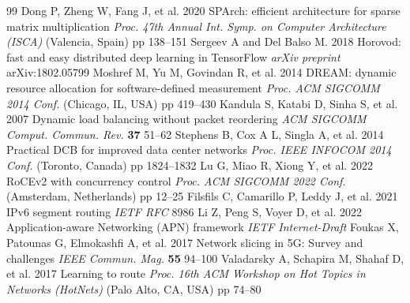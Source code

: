 \documentclass[a4paper]{jpconf}
\begin{document}
\begin{thebibliography}{99}
 Dong P, Zheng W, Fang J, et al. 2020 SPArch: efficient architecture for sparse matrix multiplication \textit{Proc. 47th Annual Int. Symp. on Computer Architecture (ISCA)} (Valencia, Spain) pp 138--151
 Sergeev A and Del Balso M. 2018 Horovod: fast and easy distributed deep learning in TensorFlow \textit{arXiv preprint} arXiv:1802.05799
 Moshref M, Yu M, Govindan R, et al. 2014 DREAM: dynamic resource allocation for software-defined measurement \textit{Proc. ACM SIGCOMM 2014 Conf.} (Chicago, IL, USA) pp 419--430
 Kandula S, Katabi D, Sinha S, et al. 2007 Dynamic load balancing without packet reordering \textit{ACM SIGCOMM Comput. Commun. Rev.} \textbf{37} 51--62
 Stephens B, Cox A L, Singla A, et al. 2014 Practical DCB for improved data center networks \textit{Proc. IEEE INFOCOM 2014 Conf.} (Toronto, Canada) pp 1824--1832
 Lu G, Miao R, Xiong Y, et al. 2022 RoCEv2 with concurrency control \textit{Proc. ACM SIGCOMM 2022 Conf.} (Amsterdam, Netherlands) pp 12--25
 Filsfils C, Camarillo P, Leddy J, et al. 2021 IPv6 segment routing \textit{IETF RFC} 8986
 Li Z, Peng S, Voyer D, et al. 2022 Application-aware Networking (APN) framework \textit{IETF Internet-Draft}
 Foukas X, Patounas G, Elmokashfi A, et al. 2017 Network slicing in 5G: Survey and challenges \textit{IEEE Commun. Mag.} \textbf{55} 94--100
 Valadarsky A, Schapira M, Shahaf D, et al. 2017 Learning to route \textit{Proc. 16th ACM Workshop on Hot Topics in Networks (HotNets)} (Palo Alto, CA, USA) pp 74--80
\end{thebibliography}
\end{document}
